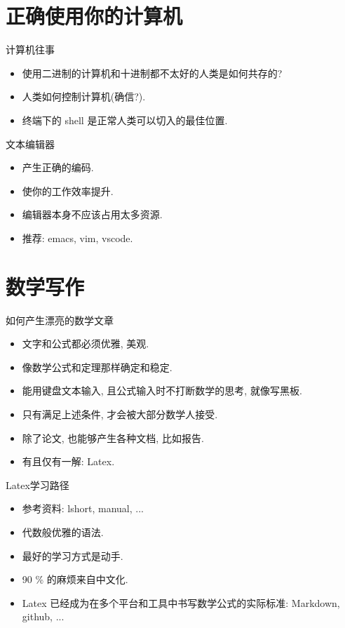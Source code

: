 \documentclass{beamer}
\begin{document}
\section{正确使用你的计算机}

\begin{frame}{计算机往事}
  \begin{itemize}
  \item<1-> 使用二进制的计算机和十进制都不太好的人类是如何共存的? 
  \item<2-> 人类如何控制计算机(确信?).
  \item<3-> 终端下的 shell 是正常人类可以切入的最佳位置.
  \end{itemize}
\end{frame}

\begin{frame}{文本编辑器}
  \begin{itemize}
  \item<1-> 产生正确的编码.
  \item<2-> 使你的工作效率提升.
  \item<3-> 编辑器本身不应该占用太多资源.
  \item<4-> 推荐: emacs, vim, vscode.
  \end{itemize}
\end{frame}

\section{数学写作}
\begin{frame}{如何产生漂亮的数学文章}
  \begin{itemize}
  \item<1-> 文字和公式都必须优雅, 美观.
  \item<2-> 像数学公式和定理那样确定和稳定.
  \item<3-> 能用键盘文本输入, 且公式输入时不打断数学的思考, 就像写黑板.
  \item<4-> 只有满足上述条件, 才会被大部分数学人接受.
  \item<5-> 除了论文, 也能够产生各种文档, 比如报告.
  \item<6-> 有且仅有一解: Latex.
  \end{itemize}
\end{frame}

\begin{frame}{Latex学习路径}
  \begin{itemize}
  \item<1-> 参考资料: lshort, manual, ...
  \item<2-> 代数般优雅的语法.
  \item<3-> 最好的学习方式是动手. 
  \item<4-> 90 \% 的麻烦来自中文化.
  \item<5-> Latex 已经成为在多个平台和工具中书写数学公式的实际标准: Markdown, github, ...
  \end{itemize}
\end{frame}
\end{document}
